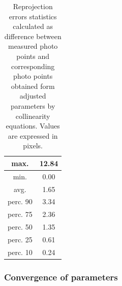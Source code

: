\documentclass[a4paper,12pt]{article}
\begin{document}
\begin{center}
\footnotesize
{}
\begin{longtable}{| c | c |}
\caption{Reprojection errors statistics calculated 
as difference between measured photo points and  corresponding photo points 
obtained form adjusted parameters by collinearity equations.
Values are expressed in pixels.}
\label{table:rep_e_results}
\\ \hline
max. & 12.84 \\ \hline 
min. & 0.00 \\ \hline 
avg.  & 1.65 \\ \hline 
perc. 90  & 3.34 \\ \hline 
perc. 75  & 2.36 \\ \hline 
perc. 50  & 1.35 \\ \hline 
perc. 25  & 0.61 \\ \hline 
perc. 10  & 0.24 \\ \hline 
\hline 
\end{longtable}
\end{center}

\subsubsection{Convergence of parameters}
\end{document}
